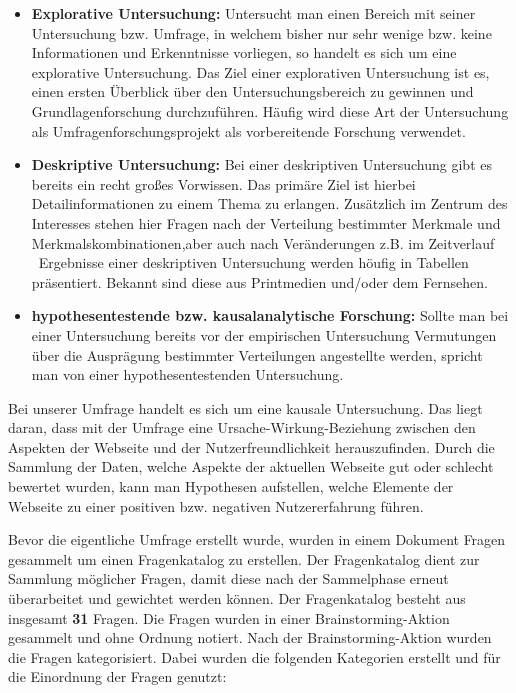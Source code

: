 \begin{itemize}
    \item \textbf{Explorative Untersuchung:} Untersucht man einen Bereich mit seiner Untersuchung bzw. Umfrage, in welchem bisher nur sehr wenige bzw. keine Informationen und Erkenntnisse vorliegen, so handelt es sich um eine explorative Untersuchung. Das Ziel einer explorativen Untersuchung ist es, einen ersten Überblick über den Untersuchungsbereich zu gewinnen und Grundlagenforschung durchzuführen. Häufig wird diese Art der Untersuchung als Umfragenforschungsprojekt als vorbereitende Forschung verwendet. \cite{umfrage:2011}
    \item \textbf{Deskriptive Untersuchung:} Bei einer deskriptiven Untersuchung gibt es bereits ein recht großes Vorwissen. Das primäre Ziel ist hierbei Detailinformationen zu einem Thema zu erlangen. Zusätzlich im Zentrum des Interesses stehen hier Fragen nach der Verteilung bestimmter Merkmale und Merkmalskombinationen,aber auch nach Veränderungen z.B. im Zeitverlauf \cite{umfrage:2011}\ Ergebnisse einer deskriptiven Untersuchung werden höufig in Tabellen präsentiert. Bekannt sind diese aus Printmedien und/oder dem Fernsehen.\cite{umfrage:2011}
    \item \textbf{hypothesentestende bzw. kausalanalytische Forschung:} Sollte man bei einer Untersuchung bereits vor der empirischen Untersuchung Vermutungen über die Ausprägung bestimmter Verteilungen angestellte werden, spricht man von einer hypothesentestenden Untersuchung.\cite{umfrage:2011}
\end{itemize}

Bei unserer Umfrage handelt es sich um eine kausale Untersuchung.
Das liegt daran, dass mit der Umfrage eine Ursache-Wirkung-Beziehung zwischen den Aspekten der Webseite und der Nutzerfreundlichkeit herauszufinden.
Durch die Sammlung der Daten, welche Aspekte der aktuellen Webseite gut oder schlecht bewertet wurden, kann man Hypothesen aufstellen, welche Elemente der Webseite zu einer positiven bzw. negativen Nutzererfahrung führen.\

Bevor die eigentliche Umfrage erstellt wurde, wurden in einem Dokument Fragen gesammelt um einen Fragenkatalog zu erstellen. Der Fragenkatalog dient zur Sammlung möglicher Fragen, damit diese nach der Sammelphase erneut überarbeitet und gewichtet werden können.
Der Fragenkatalog besteht aus insgesamt \textbf{31} Fragen.
Die Fragen wurden in einer Brainstorming-Aktion gesammelt und ohne Ordnung notiert.
Nach der Brainstorming-Aktion wurden die Fragen kategorisiert.
Dabei wurden die folgenden Kategorien erstellt und für die Einordnung der Fragen genutzt:

